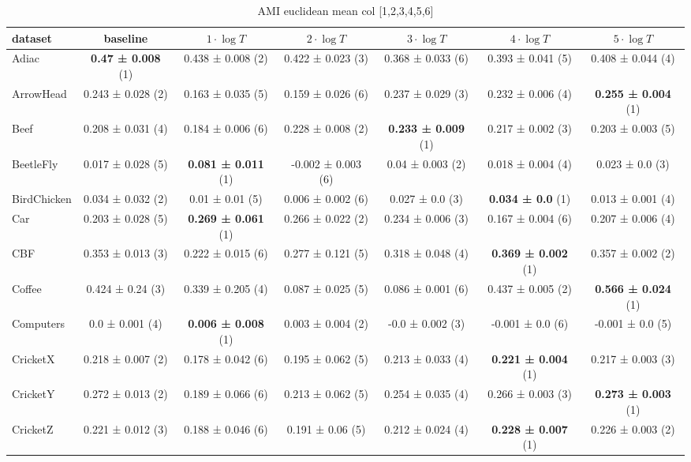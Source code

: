 \begin{table}[ht]
    \caption{AMI euclidean mean col [1,2,3,4,5,6]} 
    \begin{adjustbox}{width=\textwidth}
    \begin{tabular}{lcccccc}
    \hline
    dataset & baseline & \textbf{$1\cdot \log{T}$} & \textbf{$2\cdot \log{T}$} & \textbf{$3\cdot \log{T}$} & \textbf{$4\cdot \log{T}$} & \textbf{$5\cdot \log{T}$} \\ \hline
    Adiac & \textbf{0.47 ± 0.008} (1) & 0.438 ± 0.008 (2) & 0.422 ± 0.023 (3) & 0.368 ± 0.033 (6) & 0.393 ± 0.041 (5) & 0.408 ± 0.044 (4) \\
    ArrowHead & 0.243 ± 0.028 (2) & 0.163 ± 0.035 (5) & 0.159 ± 0.026 (6) & 0.237 ± 0.029 (3) & 0.232 ± 0.006 (4) & \textbf{0.255 ± 0.004} (1) \\
    Beef & 0.208 ± 0.031 (4) & 0.184 ± 0.006 (6) & 0.228 ± 0.008 (2) & \textbf{0.233 ± 0.009} (1) & 0.217 ± 0.002 (3) & 0.203 ± 0.003 (5) \\
    BeetleFly & 0.017 ± 0.028 (5) & \textbf{0.081 ± 0.011} (1) & -0.002 ± 0.003 (6) & 0.04 ± 0.003 (2) & 0.018 ± 0.004 (4) & 0.023 ± 0.0 (3) \\
    BirdChicken & 0.034 ± 0.032 (2) & 0.01 ± 0.01 (5) & 0.006 ± 0.002 (6) & 0.027 ± 0.0 (3) & \textbf{0.034 ± 0.0} (1) & 0.013 ± 0.001 (4) \\
    Car & 0.203 ± 0.028 (5) & \textbf{0.269 ± 0.061} (1) & 0.266 ± 0.022 (2) & 0.234 ± 0.006 (3) & 0.167 ± 0.004 (6) & 0.207 ± 0.006 (4) \\
    CBF & 0.353 ± 0.013 (3) & 0.222 ± 0.015 (6) & 0.277 ± 0.121 (5) & 0.318 ± 0.048 (4) & \textbf{0.369 ± 0.002} (1) & 0.357 ± 0.002 (2) \\
    Coffee & 0.424 ± 0.24 (3) & 0.339 ± 0.205 (4) & 0.087 ± 0.025 (5) & 0.086 ± 0.001 (6) & 0.437 ± 0.005 (2) & \textbf{0.566 ± 0.024} (1) \\
    Computers & 0.0 ± 0.001 (4) & \textbf{0.006 ± 0.008} (1) & 0.003 ± 0.004 (2) & -0.0 ± 0.002 (3) & -0.001 ± 0.0 (6) & -0.001 ± 0.0 (5) \\
    CricketX & 0.218 ± 0.007 (2) & 0.178 ± 0.042 (6) & 0.195 ± 0.062 (5) & 0.213 ± 0.033 (4) & \textbf{0.221 ± 0.004} (1) & 0.217 ± 0.003 (3) \\
    CricketY & 0.272 ± 0.013 (2) & 0.189 ± 0.066 (6) & 0.213 ± 0.062 (5) & 0.254 ± 0.035 (4) & 0.266 ± 0.003 (3) & \textbf{0.273 ± 0.003} (1) \\
    CricketZ & 0.221 ± 0.012 (3) & 0.188 ± 0.046 (6) & 0.191 ± 0.06 (5) & 0.212 ± 0.024 (4) & \textbf{0.228 ± 0.007} (1) & 0.226 ± 0.003 (2) \\

\end{tabular}
\end{adjustbox}
\end{table}
